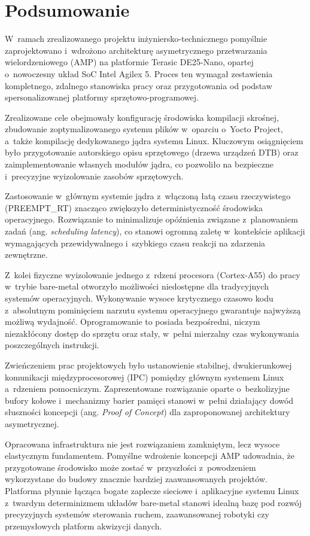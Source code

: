 \chapter{Podsumowanie}
\label{ch:podsumowanie}

W~ramach zrealizowanego projektu inżyniersko-technicznego pomyślnie zaprojektowano i~wdrożono architekturę asymetrycznego przetwarzania wielordzeniowego (AMP) na platformie Terasic DE25-Nano, opartej o~nowoczesny układ SoC Intel Agilex 5. Proces ten wymagał zestawienia kompletnego, zdalnego stanowiska pracy oraz przygotowania od podstaw spersonalizowanej platformy sprzętowo-programowej.

Zrealizowane cele obejmowały konfigurację środowiska kompilacji skrośnej, zbudowanie zoptymalizowanego systemu plików w~oparciu o~Yocto Project, a~także kompilację dedykowanego jądra systemu Linux. Kluczowym osiągnięciem było przygotowanie autorskiego opisu sprzętowego (drzewa urządzeń DTB) oraz zaimplementowanie własnych modułów jądra, co pozwoliło na bezpieczne i~precyzyjne wyizolowanie zasobów sprzętowych.

Zastosowanie w~głównym systemie jądra z~włączoną łatą czasu rzeczywistego (PREEMPT\_RT) znacząco zwiększyło deterministyczność środowiska operacyjnego. Rozwiązanie to minimalizuje opóźnienia związane z~planowaniem zadań (ang. \textit{scheduling latency}), co stanowi ogromną zaletę w~kontekście aplikacji wymagających przewidywalnego i~szybkiego czasu reakcji na zdarzenia zewnętrzne.

Z~kolei fizyczne wyizolowanie jednego z~rdzeni procesora (Cortex-A55) do pracy w~trybie bare-metal otworzyło możliwości niedostępne dla tradycyjnych systemów operacyjnych. Wykonywanie wysoce krytycznego czasowo kodu z~absolutnym pominięciem narzutu systemu operacyjnego gwarantuje najwyższą możliwą wydajność. Oprogramowanie to posiada bezpośredni, niczym niezakłócony dostęp do sprzętu oraz stały, w~pełni mierzalny czas wykonywania poszczególnych instrukcji.

Zwieńczeniem prac projektowych było ustanowienie stabilnej, dwukierunkowej komunikacji międzyprocesorowej (IPC) pomiędzy głównym systemem Linux a~rdzeniem pomocniczym. Zaprezentowane rozwiązanie oparte o~bezkolizyjne bufory kołowe i~mechanizmy barier pamięci stanowi w~pełni działający dowód słuszności koncepcji (ang. \textit{Proof of Concept}) dla zaproponowanej architektury asymetrycznej.

Opracowana infrastruktura nie jest rozwiązaniem zamkniętym, lecz wysoce elastycznym fundamentem. Pomyślne wdrożenie koncepcji AMP udowadnia, że przygotowane środowisko może zostać w~przyszłości z~powodzeniem wykorzystane do budowy znacznie bardziej zaawansowanych projektów. Platforma płynnie łącząca bogate zaplecze sieciowe i~aplikacyjne systemu Linux z~twardym determinizmem układów bare-metal stanowi idealną bazę pod rozwój precyzyjnych systemów sterowania ruchem, zaawansowanej robotyki czy przemysłowych platform akwizycji danych.